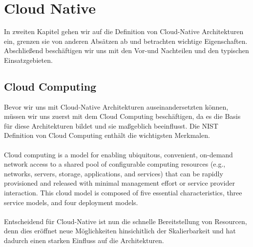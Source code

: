 \chapter{Cloud Native}

In zweiten Kapitel gehen wir auf die Definition von Cloud-Native Architekturen ein, grenzen sie von anderen Absätzen ab und betrachten wichtige Eigenschaften. Abschließend beschäftigen wir uns mit den Vor-und Nachteilen und den typischen Einsatzgebieten.

\section{Cloud Computing}
Bevor wir uns mit Cloud-Native Architekturen auseinandersetzten können, müssen wir uns zuerst mit dem Cloud Computing beschäftigen, da es die Basis für diese Architekturen bildet und sie maßgeblich beeinflusst. Die NIST Definition von Cloud Computing enthält die wichtigsten Merkmalen.\\
\\
Cloud computing is a model for enabling ubiquitous, convenient, on-demand network access to a shared pool of configurable computing resources (e.g., networks, servers, storage, applications, and services) that can be rapidly provisioned and released with minimal management effort or service provider interaction. This cloud model is composed of five essential characteristics, three service models, and four deployment models.\\
\\
Entscheidend für Cloud-Native ist nun die schnelle Bereitstellung von Resourcen, denn dies eröffnet neue Möglichkeiten hinsichitlich der Skalierbarkeit und hat dadurch einen starken Einfluss auf die Architekturen.

